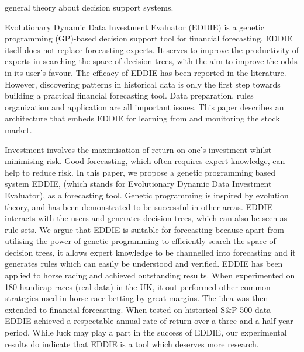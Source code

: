 \cite{Keen1980} general theory about decision support systems.

\cite{Tsang2004} Evolutionary Dynamic Data Investment Evaluator (EDDIE) is a
genetic programming (GP)-based decision support tool for financial
forecasting. EDDIE itself does not replace forecasting experts. It serves to
improve the productivity of experts in searching the space of decision trees,
with the aim to improve the odds in its user’s favour. The efficacy of EDDIE has
been reported in the literature. However, discovering patterns in historical
data is only the first step towards building a practical financial forecasting
tool. Data preparation, rules organization and application are all important
issues. This paper describes an architecture that embeds EDDIE for learning from
and monitoring the stock market.

\cite{tsang1998eddie} Investment involves the maximisation of return on one’s
investment whilst minimising risk. Good forecasting, which often requires expert
knowledge, can help to reduce risk. In this paper, we propose a genetic
programming based system EDDIE, (which stands for Evolutionary Dynamic Data
Investment Evaluator), as a forecasting tool. Genetic programming is inspired by
evolution theory, and has been demonstrated to be successful in other
areas. EDDIE interacts with the users and generates decision trees, which can
also be seen as rule sets. We argue that EDDIE is suitable for forecasting
because apart from utilising the power of genetic programming to efficiently
search the space of decision trees, it allows expert knowledge to be channelled
into forecasting and it generates rules which can easily be understood and
verified. EDDIE has been applied to horse racing and achieved outstanding
results. When experimented on 180 handicap races (real data) in the UK, it
out-performed other common strategies used in horse race betting by great
margins. The idea was then extended to financial forecasting. When tested on
historical S&P-500 data EDDIE achieved a respectable annual rate of return over
a three and a half year period. While luck may play a part in the success of
EDDIE, our experimental results do indicate that EDDIE is a tool which deserves
more research.

